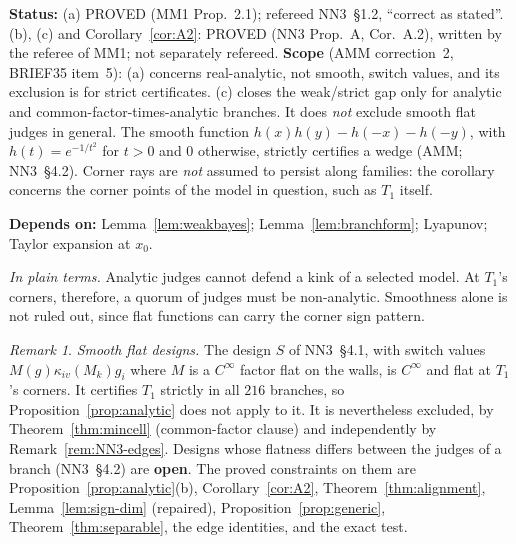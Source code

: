 \documentclass[11pt]{article}
\theoremstyle{definition}
\theoremstyle{remark}
\newtheorem{remark}[theorem]{Remark}
\newcommand{\src}[1]{\textsf{#1}}
\newcommand{\status}[1]{\par\smallskip\noindent\textbf{Status:} #1\par}
\newcommand{\deps}[1]{\noindent\textbf{Depends on:} #1\par}
\newcommand{\inwords}[1]{\noindent\textit{In plain terms.} #1\par\smallskip}
\begin{document}
\status{(a) PROVED (\src{MM1} Prop.~2.1); refereed \src{NN3}~\S1.2, ``correct as stated''. (b), (c) and Corollary~\ref{cor:A2}: PROVED (\src{NN3} Prop.~A, Cor.~A.2), written by the referee of \src{MM1}; not separately refereed. \textbf{Scope} (\src{AMM} correction~2, \src{BRIEF35} item~5): (a) concerns real-analytic, not smooth, switch values, and its exclusion is for strict certificates. (c) closes the weak/strict gap only for analytic and common-factor-times-analytic branches. It does \emph{not} exclude smooth flat judges in general. The smooth function $h(x)h(y)-h(-x)-h(-y)$, with $h(t)=e^{-1/t^2}$ for $t>0$ and $0$ otherwise, strictly certifies a wedge (\src{AMM}; \src{NN3}~\S4.2). Corner rays are \emph{not} assumed to persist along families: the corollary concerns the corner points of the model in question, such as $T_1$ itself.}
\deps{Lemma~\ref{lem:weakbayes}; Lemma~\ref{lem:branchform}; Lyapunov; Taylor expansion at $x_0$.}
\inwords{Analytic judges cannot defend a kink of a selected model. At $T_1$'s corners, therefore, a quorum of judges must be non-analytic. Smoothness alone is not ruled out, since flat functions can carry the corner sign pattern.}

\begin{remark}\label{rem:flat}
\emph{Smooth flat designs.} The design $S$ of \src{NN3}~\S4.1, with switch values $M(g)\kappa_{iv}(M_k)g_i$ where $M$ is a $C^\infty$ factor flat on the walls, is $C^\infty$ and flat at $T_1$'s corners. It certifies $T_1$ strictly in all $216$ branches, so Proposition~\ref{prop:analytic} does not apply to it. It is nevertheless excluded, by Theorem~\ref{thm:mincell} (common-factor clause) and independently by Remark~\ref{rem:NN3-edges}. Designs whose flatness differs between the judges of a branch (\src{NN3}~\S4.2) are \textbf{open}. The proved constraints on them are Proposition~\ref{prop:analytic}(b), Corollary~\ref{cor:A2}, Theorem~\ref{thm:alignment}, Lemma~\ref{lem:sign-dim} (repaired), Proposition~\ref{prop:generic}, Theorem~\ref{thm:separable}, the edge identities, and the exact test.
\end{remark}
\end{document}
